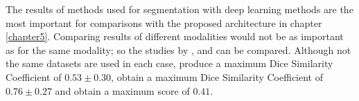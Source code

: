 The results of methods used for segmentation with deep learning methods are the most important for comparisons with the proposed architecture in chapter \ref{chapter5}. Comparing results of different modalities would not be as important as for the same modality; so the studies by \citeauthor{Yang2020}, \citeauthor{Sichermann2019} and  can be compared. Although not the same datasets are used in each case, \citeauthor{Sichermann2019} produce a maximum Dice Similarity Coefficient of $0.53 \pm 0.30$, \citeauthor{Yang2020} obtain a maximum Dice Similarity Coefficient of $0.76 \pm 0.27$ and  obtain a maximum score of $0.41$. 














